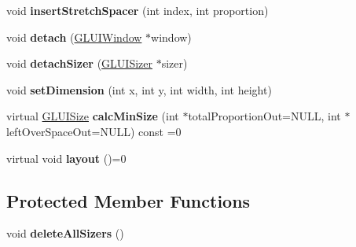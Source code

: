 \begin{DoxyCompactItemize}
\item 
\hypertarget{classCartWheel_1_1GL_1_1GLUISizer_ad46d24cb40ff95d1f3eb407c07c02c17}{
void {\bfseries insertStretchSpacer} (int index, int proportion)}
\label{classCartWheel_1_1GL_1_1GLUISizer_ad46d24cb40ff95d1f3eb407c07c02c17}

\item 
\hypertarget{classCartWheel_1_1GL_1_1GLUISizer_a7421a36083716d964f6918efd0a98711}{
void {\bfseries detach} (\hyperlink{classCartWheel_1_1GL_1_1GLUIWindow}{GLUIWindow} $\ast$window)}
\label{classCartWheel_1_1GL_1_1GLUISizer_a7421a36083716d964f6918efd0a98711}

\item 
\hypertarget{classCartWheel_1_1GL_1_1GLUISizer_a753a62022997dc0155635c01dfac2580}{
void {\bfseries detachSizer} (\hyperlink{classCartWheel_1_1GL_1_1GLUISizer}{GLUISizer} $\ast$sizer)}
\label{classCartWheel_1_1GL_1_1GLUISizer_a753a62022997dc0155635c01dfac2580}

\item 
\hypertarget{classCartWheel_1_1GL_1_1GLUISizer_a100da6c63b745386a3badd10a35d3d31}{
void {\bfseries setDimension} (int x, int y, int width, int height)}
\label{classCartWheel_1_1GL_1_1GLUISizer_a100da6c63b745386a3badd10a35d3d31}

\item 
\hypertarget{classCartWheel_1_1GL_1_1GLUISizer_abff8da9d245456be2494bec3f48595d8}{
virtual \hyperlink{classCartWheel_1_1GL_1_1GLUISize}{GLUISize} {\bfseries calcMinSize} (int $\ast$totalProportionOut=NULL, int $\ast$leftOverSpaceOut=NULL) const =0}
\label{classCartWheel_1_1GL_1_1GLUISizer_abff8da9d245456be2494bec3f48595d8}

\item 
\hypertarget{classCartWheel_1_1GL_1_1GLUISizer_a220aeecfb79fc235a94c0dc1d2fe8e1f}{
virtual void {\bfseries layout} ()=0}
\label{classCartWheel_1_1GL_1_1GLUISizer_a220aeecfb79fc235a94c0dc1d2fe8e1f}

\end{DoxyCompactItemize}
\subsection*{Protected Member Functions}
\begin{DoxyCompactItemize}
\item 
\hypertarget{classCartWheel_1_1GL_1_1GLUISizer_a7bcb0482290187003041968157ee9abe}{
void {\bfseries deleteAllSizers} ()}
\label{classCartWheel_1_1GL_1_1GLUISizer_a7bcb0482290187003041968157ee9abe}

\end{DoxyCompactItemize}
